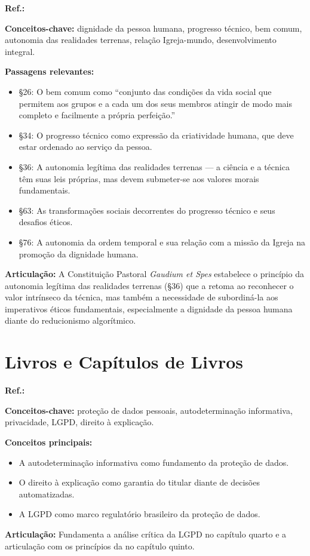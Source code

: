 \begin{fichamento}
    \textbf{Ref.:} \cite{ConcilioVaticanoII1965GS}
    
    \textbf{Conceitos-chave:} dignidade da pessoa humana, progresso técnico, bem comum, autonomia das realidades terrenas, relação Igreja-mundo, desenvolvimento integral.
    
    \textbf{Passagens relevantes:}
    \begin{itemize}
        \item §26: O bem comum como ``conjunto das condições da vida social que permitem aos grupos e a cada um dos seus membros atingir de modo mais completo e facilmente a própria perfeição.''
        \item §34: O progresso técnico como expressão da criatividade humana, que deve estar ordenado ao serviço da pessoa.
        \item §36: A autonomia legítima das realidades terrenas — a ciência e a técnica têm suas leis próprias, mas devem submeter-se aos valores morais fundamentais.
        \item §63: As transformações sociais decorrentes do progresso técnico e seus desafios éticos.
        \item §76: A autonomia da ordem temporal e sua relação com a missão da Igreja na promoção da dignidade humana.
    \end{itemize}
    
    \textbf{Articulação:} A Constituição Pastoral \textit{Gaudium et Spes} estabelece o princípio da autonomia legítima das realidades terrenas (§36) que a \MH{} retoma ao reconhecer o valor intrínseco da técnica, mas também a necessidade de subordiná-la aos imperativos éticos fundamentais, especialmente a dignidade da pessoa humana diante do reducionismo algorítmico.
\end{fichamento}

\section{Livros e Capítulos de Livros}

\begin{fichamento}
    \textbf{Ref.:} \cite{Bioni2021PPD}
    
    \textbf{Conceitos-chave:} proteção de dados pessoais, autodeterminação informativa, privacidade, LGPD, direito à explicação.
    
    \textbf{Conceitos principais:}
    \begin{itemize}
        \item A autodeterminação informativa como fundamento da proteção de dados.
        \item O direito à explicação como garantia do titular diante de decisões automatizadas.
        \item A LGPD como marco regulatório brasileiro da proteção de dados.
    \end{itemize}
    
    \textbf{Articulação:} Fundamenta a análise crítica da LGPD no capítulo quarto e a articulação com os princípios da \MH{} no capítulo quinto.
\end{fichamento}

